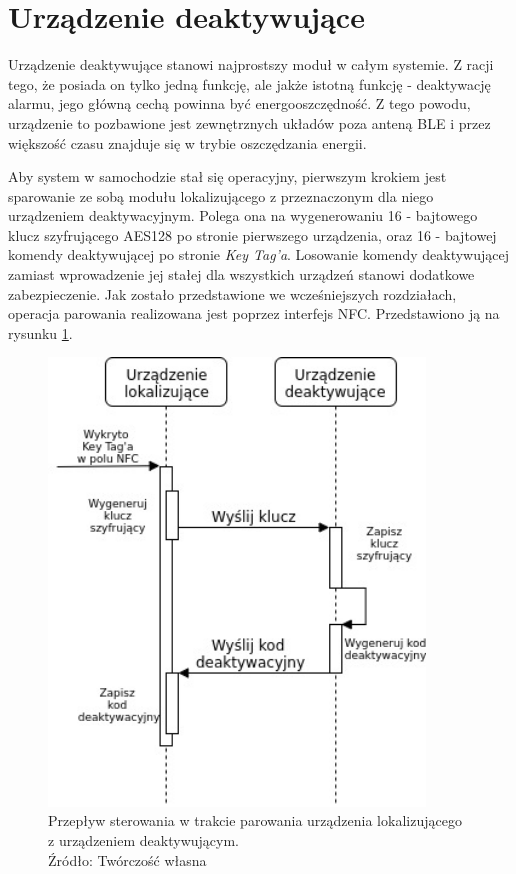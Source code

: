 \section{Urządzenie deaktywujące}

Urządzenie deaktywujące stanowi najprostszy moduł w całym systemie. Z racji tego, że posiada on tylko jedną funkcję, ale jakże istotną funkcję - deaktywację alarmu, jego główną cechą powinna być energooszczędność. Z tego powodu, urządzenie to  pozbawione jest zewnętrznych układów poza anteną BLE i przez większość czasu znajduje się w trybie oszczędzania energii. 

Aby system w samochodzie stał się operacyjny, pierwszym krokiem jest sparowanie ze sobą modułu lokalizującego z przeznaczonym dla niego urządzeniem deaktywacyjnym. Polega ona na wygenerowaniu 16 - bajtowego klucz szyfrującego AES128 po stronie pierwszego urządzenia, oraz 16 - bajtowej komendy deaktywującej po stronie \textit{Key Tag'a}. Losowanie komendy deaktywującej zamiast wprowadzenie jej stałej dla wszystkich urządzeń stanowi dodatkowe zabezpieczenie. Jak zostało przedstawione we wcześniejszych rozdziałach, operacja parowania realizowana jest poprzez interfejs NFC. Przedstawiono ją na rysunku \ref{fig:image_soft_keytag_key exchange}.

\begin{figure}[H]
	\centering
	\includegraphics[width=10cm]{img/software/keytag/Key_exchange.jpg}
	\caption{Przepływ sterowania w trakcie parowania urządzenia lokalizującego z urządzeniem deaktywującym. 
	\\Źródło: Twórczość własna}
	\label{fig:image_soft_keytag_key exchange}
\end{figure}

